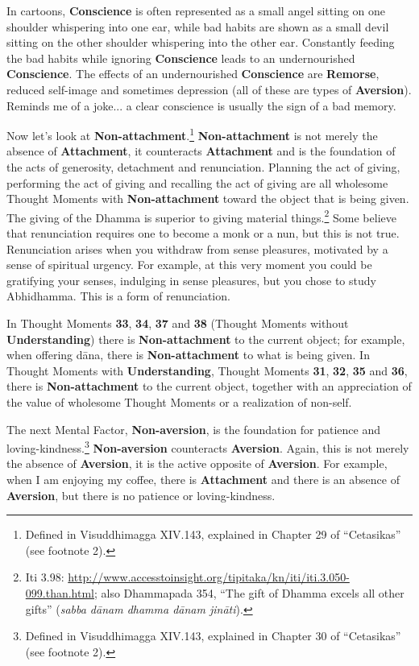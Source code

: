 In cartoons, \textbf{Conscience} is often represented as a small angel sitting on one shoulder whispering into one ear, while bad habits are shown as a small devil sitting on the other shoulder whispering into the other ear. Constantly feeding the bad habits while ignoring \textbf{Conscience} leads to an undernourished \textbf{Conscience}. The effects of an undernourished \textbf{Conscience} are \textbf{Remorse}, reduced self-image and sometimes depression (all of these are types of \textbf{Aversion}). Reminds me of a joke... a clear conscience is usually the sign of a bad memory.

Now let’s look at \textbf{Non-attachment}.\footnote{Defined in Visuddhimagga XIV.143, explained in Chapter 29 of “Cetasikas” (see footnote 2).} \textbf{Non-attachment} is not merely the absence of \textbf{Attachment}, it counteracts \textbf{Attachment} and is the foundation of the acts of generosity, detachment and renunciation. Planning the act of giving, performing the act of giving and recalling the act of giving are all wholesome Thought Moments with \textbf{Non-attachment} toward the object that is being given. The giving of the Dhamma is superior to giving material things.\footnote{Iti 3.98: \url{http://www.accesstoinsight.org/tipitaka/kn/iti/iti.3.050-099.than.html}; also Dhammapada 354, “The gift of Dhamma excels all other gifts” (\textit{sabba dānam dhamma dānam jināti}).} Some believe that renunciation requires one to become a monk or a nun, but this is not true. Renunciation arises when you withdraw from sense pleasures, motivated by a sense of spiritual urgency. For example, at this very moment you could be gratifying your senses, indulging in sense pleasures, but you chose to study Abhidhamma. This is a form of renunciation.

In Thought Moments \textbf{33}, \textbf{34}, \textbf{37} and \textbf{38} (Thought Moments without \textbf{Understanding}) there is \textbf{Non-attachment} to the current object; for example, when offering dāna, there is \textbf{Non-attachment} to what is being given. In Thought Moments with \textbf{Understanding}, Thought Moments \textbf{31}, \textbf{32}, \textbf{35} and \textbf{36}, there is \textbf{Non-attachment} to the current object, together with an appreciation of the value of wholesome Thought Moments or a realization of non-self.

The next Mental Factor, \textbf{Non-aversion}, is the foundation for patience and loving-kindness.\footnote{Defined in Visuddhimagga XIV.143, explained in Chapter 30 of “Cetasikas” (see footnote 2).} \textbf{Non-aversion} counteracts \textbf{Aversion}. Again, this is not merely the absence of \textbf{Aversion}, it is the active opposite of \textbf{Aversion}. For example, when I am enjoying my coffee, there is \textbf{Attachment} and there is an absence of \textbf{Aversion}, but there is no patience or loving-kindness.

